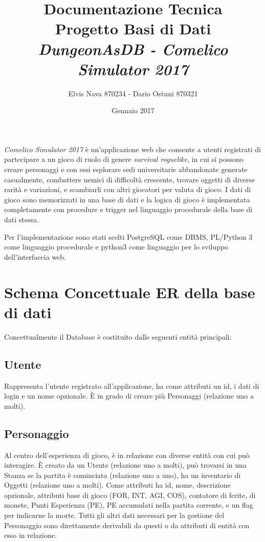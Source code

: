 \documentclass[10pt,a4paper]{article}
\author{Elvis Nava 870234 - Dario Ostuni 870321}
\title{Documentazione Tecnica\\
 Progetto Basi di Dati\\
\textit{DungeonAsDB - Comelico Simulator 2017}}
\date{Gennaio 2017}
\begin{document}
\maketitle

\textit{Comelico Simulator 2017} è un'applicazione web che consente a utenti registrati di partecipare a un gioco di ruolo di genere \textit{survival roguelike}, in cui si possono creare personaggi e con essi esplorare sedi universitarie abbandonate generate casualmente, combattere nemici di difficoltà crescente, trovare oggetti di diverse rarità e variazioni, e scambiarli con altri giocatori per valuta di gioco. I dati di gioco sono memorizzati in una base di dati e la logica di gioco è implementata completamente con procedure e trigger nel linguaggio procedurale della base di dati stessa.

Per l'implementazione sono stati scelti PostgreSQL come DBMS, PL/Python 3 come linguaggio procedurale e python3 come linguaggio per lo sviluppo dell'interfaccia web.



\section{Schema Concettuale ER della base di dati}
Concettualmente il Database è costituito dalle seguenti entità principali:

\subsection{Utente}
Rappresenta l'utente registrato all'applicazione, ha come attributi un id, i dati di login e un nome opzionale. È in grado di creare più Personaggi (relazione uno a molti).

\subsection{Personaggio}
Al centro dell'esperienza di gioco, è in relazione con diverse entità con cui può interagire. È creato da un Utente (relazione uno a molti), può trovarsi in una Stanza se la partita è cominciata (relazione uno a uno), ha un inventario di Oggetti (relazione uno a molti). Come attributi ha id, nome, descrizione opzionale, attributi base di gioco (FOR, INT, AGI, COS), contatore di ferite, di monete, Punti Esperienza (PE), PE accumulati nella partita corrente, e un flag per indicarne la morte. Tutti gli altri dati necessari per la gestione del Personaggio sono direttamente derivabili da questi o da attributi di entità con esso in relazione.
\end{document}
